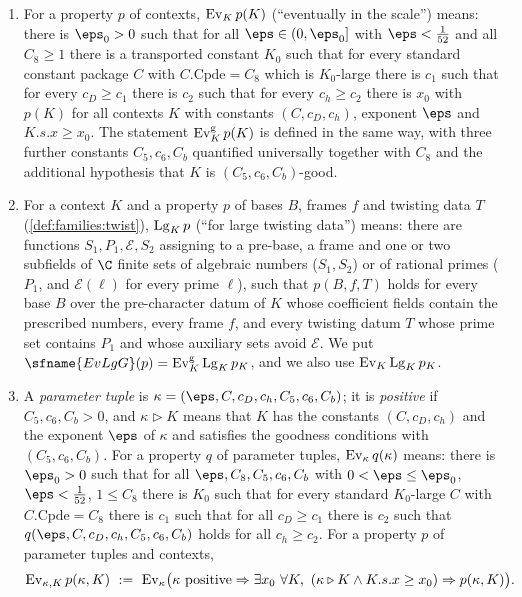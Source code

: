 \begin{definition}\label{pf:stageU:ev}
\begin{enumerate}[label=(\alph*)]
\item For a property $p$ of contexts, $\mathrm{Ev}_K\,p(K)$ (``eventually in the scale'') means: there is $\eps_0>0$ such
that for all $\eps\in(0,\eps_0]$ with $\eps<\frac1{52}$ and all $C_8\ge1$ there is a transported constant $K_0$ such
that for every standard constant package $C$ with $C.\mathrm{Cpde}=C_8$ which is $K_0$-large there is $c_1$ such that for
every $c_D\ge c_1$ there is $c_2$ such that for every $c_h\ge c_2$ there is $x_0$ with $p(K)$ for all contexts $K$ with
constants $(C,c_D,c_h)$, exponent $\eps$ and $K.s.x\ge x_0$. The statement $\mathrm{Ev}^{\mathrm g}_K\,p(K)$ is defined in the
same way, with three further constants $C_5,c_6,C_b$ quantified universally together with $C_8$ and the additional
hypothesis that $K$ is $(C_5,c_6,C_b)$-good.
\item For a context $K$ and a property $p$ of bases $B$, frames $f$ and twisting data $T$ (\cref{def:families:twist}),
$\mathrm{Lg}_K\,p$ (``for large twisting data'') means: there are functions $S_1,P_1,\mathcal E,S_2$ assigning to a
pre-base, a frame and one or two subfields of $\C$ finite sets of algebraic numbers ($S_1,S_2$) or of rational primes
($P_1$, and $\mathcal E(\ell)$ for every prime $\ell$), such that $p(B,f,T)$ holds for every base $B$ over the pre-character
datum of $K$ whose coefficient fields contain the prescribed numbers, every frame $f$, and every twisting datum $T$
whose prime set contains $P_1$ and whose auxiliary sets avoid $\mathcal E$. We put
$\sfname{EvLgG}(p)=\stageUEv^{\mathrm g}_K\,\stageULg_K\,p_K$, and we also use $\mathrm{Ev}_K\,\mathrm{Lg}_K\,p_K$.
\item A \emph{parameter tuple} is $\kappa=(\eps,C,c_D,c_h,C_5,c_6,C_b)$; it is \emph{positive} if $C_5,c_6,C_b>0$, and
$\kappa\triangleright K$ means that $K$ has the constants $(C,c_D,c_h)$ and the exponent $\eps$ of $\kappa$ and satisfies the
goodness conditions with $(C_5,c_6,C_b)$. For a property $q$ of parameter tuples, $\mathrm{Ev}_\kappa\,q(\kappa)$ means:
there is $\eps_0>0$ such that for all $\eps,C_8,C_5,c_6,C_b$ with $0<\eps\le\eps_0$, $\eps<\frac1{52}$, $1\le C_8$ there is
$K_0$ such that for every standard $K_0$-large $C$ with $C.\mathrm{Cpde}=C_8$ there is $c_1$ such that for all $c_D\ge c_1$
there is $c_2$ such that $q(\eps,C,c_D,c_h,C_5,c_6,C_b)$ holds for all $c_h\ge c_2$. For a property $p$ of parameter
tuples and contexts,
\[
\stageUEv_{\kappa,K}\,p(\kappa,K)\ :=\ \stageUEv_\kappa\bigl(\kappa\text{ positive}\Rightarrow\exists x_0\ \forall K,\
(\kappa\triangleright K\wedge K.s.x\ge x_0)\Rightarrow p(\kappa,K)\bigr).
\]
\end{enumerate}
\formal{GlobalTheory.Fc.ParEv}\formal{GlobalTheory.Fc.EvP}
\end{definition}

